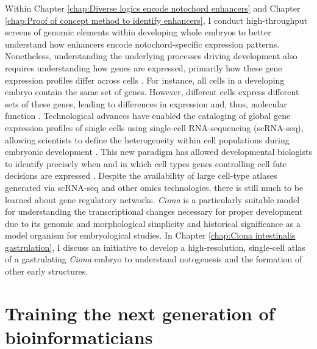\begin{dissertationintroduction}
    Within Chapter \ref{chap:Diverse logics encode notochord enhancers} and Chapter \ref{chap:Proof of concept method to identify enhancers}, I conduct high-throughput screens of genomic elements within developing whole embryos to better understand how enhancers encode notochord-specific expression patterns. Nonetheless, understanding the underlying processes driving development also requires understanding how genes are expressed, primarily how these gene expression profiles differ across cells \cite{peter2011}. For instance, all cells in a developing embryo contain the same set of genes. However, different cells express different sets of these genes, leading to differences in expression and, thus, molecular function \cite{arnone1997, peter2011}. Technological advances have enabled the cataloging of global gene expression profiles of single cells using single-cell RNA-sequencing (scRNA-seq), allowing scientists to define the heterogeneity within cell populations during embryonic development \cite{klein2015a, macosko2015, olsen2018}. This new paradigm has allowed developmental biologists to identify precisely when and in which cell types genes controlling cell fate decisions are expressed \cite{klein2019}. Despite the availability of large cell-type atlases generated via scRNA-seq and other omics technologies, there is still much to be learned about gene regulatory networks. \textit{Ciona} is a particularly suitable model for understanding the transcriptional changes necessary for proper development due to its genomic and morphological simplicity and historical significance as a model organism for embryological studies. In Chapter \ref{chap:Ciona intestinalis gastrulation}, I discuss an initiative to develop a high-resolution, single-cell atlas of a gastrulating \textit{Ciona} embryo to understand notogenesis and the formation of other early structures.  
    
    \section{Training the next generation of bioinformaticians}


\end{dissertationintroduction}

